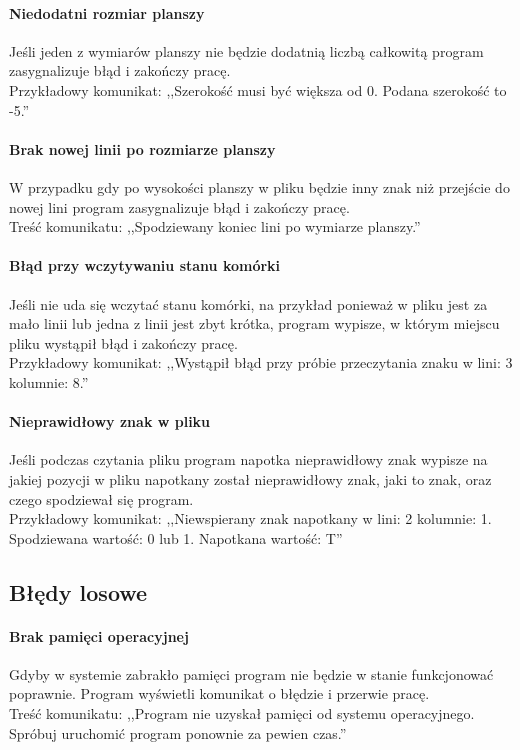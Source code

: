 \documentclass{report}
\begin{document}
 \paragraph{Niedodatni rozmiar planszy}
 Jeśli jeden z wymiarów planszy nie będzie dodatnią liczbą całkowitą program zasygnalizuje błąd i zakończy pracę. \\
 Przykładowy komunikat: ,,Szerokość musi być większa od 0. Podana szerokość to -5.''
 
 \paragraph{Brak nowej linii po rozmiarze planszy}
 W przypadku gdy po wysokości planszy w pliku będzie inny znak niż przejście do nowej lini program zasygnalizuje błąd i zakończy pracę. \\
 Treść komunikatu: ,,Spodziewany koniec lini po wymiarze planszy.''
 
 \paragraph{Błąd przy wczytywaniu stanu komórki}
 Jeśli nie uda się wczytać stanu komórki, na przykład ponieważ w pliku jest za mało linii lub jedna z linii jest zbyt krótka, program wypisze, w którym miejscu pliku wystąpił błąd i zakończy pracę. \\
 Przykładowy komunikat: ,,Wystąpił błąd przy próbie przeczytania znaku w lini: 3 kolumnie: 8.''
 
 \paragraph{Nieprawidłowy znak w pliku}
 Jeśli podczas czytania pliku program napotka nieprawidłowy znak wypisze na jakiej pozycji w pliku napotkany został nieprawidłowy znak, jaki to znak, oraz czego spodziewał się program. \\
 Przykładowy komunikat: ,,Niewspierany znak napotkany w lini: 2 kolumnie: 1. Spodziewana wartość: 0 lub 1. Napotkana wartość: T''

\subsection{Błędy losowe}
\paragraph{Brak pamięci operacyjnej}
Gdyby w systemie zabrakło pamięci program nie będzie w stanie funkcjonować poprawnie. Program wyświetli komunikat o błędzie i przerwie pracę. \\
Treść komunikatu: ,,Program nie uzyskał pamięci od systemu operacyjnego. Spróbuj uruchomić program ponownie za pewien czas.''
\end{document}
